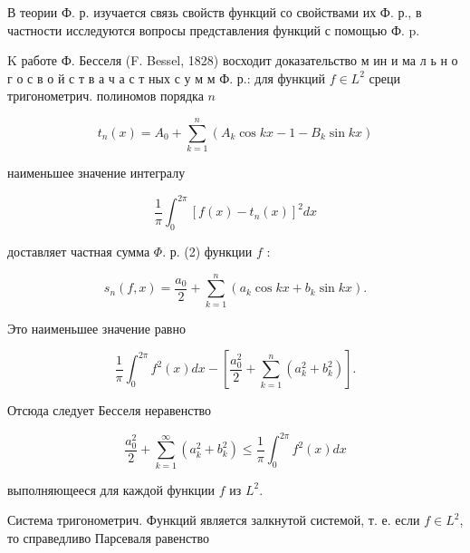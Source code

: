 \documentclass[10pt]{article}
\begin{document}
В теории Ф. р. изучается связь свойств функций со свойствами их Ф. р., в частности исследуются вопросы представления функций с помощью Ф. p.



$\mathrm{K}$ работе Ф. Бесселя (F. Bessel, 1828) восходит доказательство м ин и ма л ь н о г о с в о й с т в а ч а с т ных с у м м Ф. р.: для функций $f \in L^{2}$ среци тригонометрич. полиномов порядка $n$



\[

t_{n}(x)=A_{0}+\sum_{k=1}^{n}\left(A_{k} \cos k x-1-B_{k} \sin k x\right)

\]



наименьшее значение интегралу



\[

\frac{1}{\pi} \int_{0}^{2 \pi}\left[f(x)-t_{n}(x)\right]^{2} d x

\]



доставляет частная сумма $\Phi$. р. (2) функции $f$ :



\[

s_{n}(f, x)=\frac{a_{0}}{2}+\sum_{k=1}^{n}\left(a_{k} \cos k x+b_{k} \sin k x\right) .

\]



Это наименьшее значение равно



\[

\frac{1}{\pi} \int_{0}^{2 \pi} f^{2}(x) d x-\left[\frac{a_{0}^{2}}{2}+\sum_{k=1}^{n}\left(a_{k}^{2}+b_{k}^{2}\right)\right] .

\]



Отсюда следует Бесселя неравенство



\[

\frac{a_{0}^{2}}{2}+\sum_{k=1}^{\infty}\left(a_{k}^{2}+b_{k}^{2}\right) \leqslant \frac{1}{\pi} \int_{0}^{2 \pi} f^{2}(x) d x

\]



выполняющееся для каждой функции $f$ из $L^{2}$.



Система тригонометрич. Функций является залкнутой системой, т. е. если $f \in L^{2}$, то справедливо Парсеваля равенство
\end{document}
